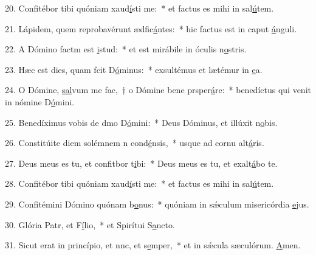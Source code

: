 20. Confitébor tibi quóniam xaud\uline{í}sti me:~* et factus es mihi in sal\uline{ú}tem.\par 
21. Lápidem, quem reprobavérunt ædfic\uline{á}ntes:~* hic factus est in caput \uline{á}nguli.\par 
22. A Dómino factm est \uline{i}stud:~* et est mirábile in óculis n\uline{o}stris.\par 
23. Hæc est dies, quam fcit D\uline{ó}minus:~* exsultémus et lætémur in \uline{e}a.\par 
24. O Dómine, \uline{sal}vum me fac,~† o Dómine bene prsper\uline{á}re:~* benedíctus qui venit in nómine D\uline{ó}mini.\par 
25. Benedíximus vobis de dmo D\uline{ó}mini:~* Deus Dóminus, et illúxit n\uline{o}bis.\par 
26. Constitúite diem solémnem n cond\uline{é}nsis,~* usque ad cornu alt\uline{á}ris.\par 
27. Deus meus es tu, et confitbor t\uline{i}bi:~* Deus meus es tu, et exalt\uline{á}bo te.\par 
28. Confitébor tibi quóniam xaud\uline{í}sti me:~* et factus es mihi in sal\uline{ú}tem.\par 
29. Confitémini Dómino quónam b\uline{o}nus:~* quóniam in sǽculum misericórdia \uline{e}jus.\par 
30. Glória Patr, et F\uline{í}lio,~* et Spirítui S\uline{a}ncto.\par 
31. Sicut erat in princípio, et nnc, et s\uline{e}mper,~* et in sǽcula sæculórum. \uline{A}men.\par 
